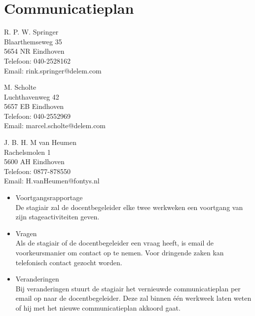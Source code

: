 \section{Communicatieplan}


R. P. W. Springer\\
Blaarthemseweg 35\\
5654 NR Eindhoven\\
Telefoon: 040-2528162\\
Email: rink.springer@delem.com

M. Scholte\\
Luchthavenweg 42\\
5657 EB Eindhoven\\
Telefoon: 040-2552969\\
Email: marcel.scholte@delem.com

J. B. H. M van Heumen \\
Rachelsmolen 1\\
5600 AH Eindhoven\\
Telefoon: 0877-878550\\
Email: H.vanHeumen@fontys.nl


\begin{itemize}
\item Voortgangsrapportage \\
De stagiair zal de docentbegeleider elke twee werkweken een voortgang van zijn stageactiviteiten geven.
\item Vragen \\
Als de stagiair of de docentbegeleider een vraag heeft, is email de voorkeursmanier om contact op te nemen. Voor dringende zaken kan telefonisch contact gezocht worden.
\item Veranderingen \\
Bij veranderingen stuurt de stagiair het vernieuwde communicatieplan per email op naar de docentbegeleider. Deze zal binnen \'e\'en werkweek laten weten of hij met het nieuwe communicatieplan akkoord gaat.
\end{itemize}


